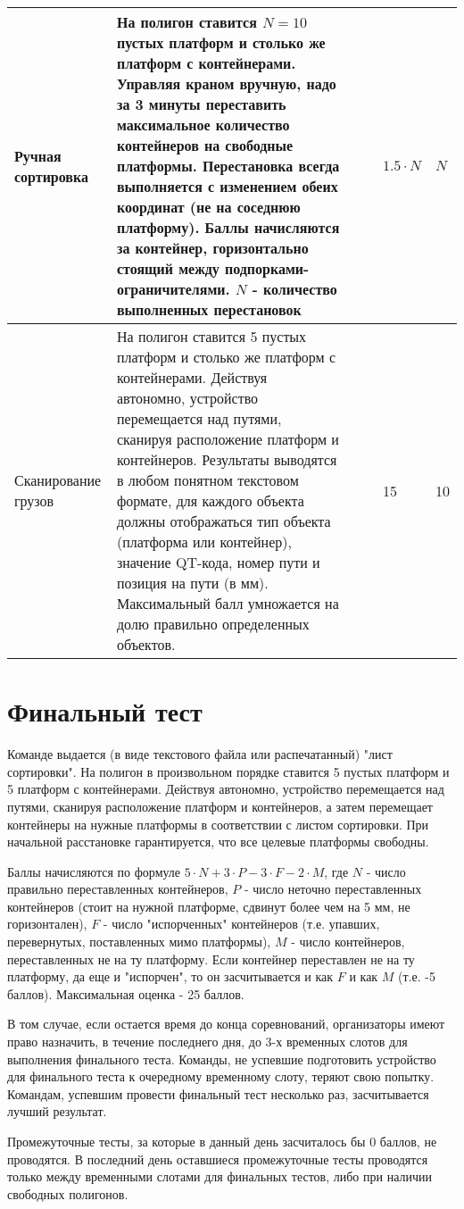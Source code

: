 \begin{center}
\begin{longtable}{|p{2.8cm}|p{6.2cm}|p{1.1cm}|p{1.1cm}|p{1.1cm}|p{1.1cm}|}
        \hline
        Ручная сортировка & На полигон ставится $N=10$ пустых платформ и столько же платформ с контейнерами. Управляя краном вручную, надо за 3 минуты переставить максимальное количество контейнеров на свободные платформы. Перестановка всегда выполняется с изменением обеих координат (не на соседнюю платформу).  Баллы начисляются за контейнер, горизонтально стоящий между подпорками-ограничителями.  $N$ - количество выполненных перестановок & & & $1.5 \cdot N$ & $N$ \\
        \hline
        Сканирование грузов & На полигон ставится 5 пустых платформ и столько же платформ с контейнерами. Действуя автономно, устройство перемещается над путями, сканируя расположение платформ и контейнеров.  Результаты выводятся в любом понятном текстовом формате, для каждого объекта должны отображаться тип объекта (платформа или контейнер), значение QT-кода, номер пути и позиция на пути (в мм). Максимальный балл умножается на долю правильно определенных объектов. & & & 15 & 10 \\
        \hline
    \end{longtable}
\end{center}

\section{Финальный тест} 

Команде выдается (в виде текстового файла или распечатанный) "лист сортировки". На полигон в произвольном порядке ставится 5 пустых платформ и 5 платформ с контейнерами. Действуя автономно, устройство перемещается над путями, сканируя расположение платформ и контейнеров, а затем перемещает контейнеры на нужные платформы в соответствии с листом сортировки. При начальной расстановке гарантируется, что все целевые платформы свободны.  

Баллы начисляются по формуле  $5 \cdot N + 3 \cdot P -3 \cdot F-2 \cdot M$,  где $N$ - число правильно переставленных контейнеров, $P$ - число неточно переставленных контейнеров (стоит на нужной платформе, сдвинут более чем на 5 мм, не горизонтален),  $F$ - число "испорченных" контейнеров (т.е. упавших, перевернутых, поставленных мимо платформы), $M$ - число контейнеров, переставленных не на ту платформу. Если контейнер переставлен не на ту платформу, да еще и "испорчен", то он засчитывается и как $F$ и как $M$  (т.е. -5 баллов).  Максимальная оценка - 25 баллов.

В том случае, если остается время до конца соревнований, организаторы имеют право назначить, в течение последнего дня, до 3-х временных слотов для выполнения финального теста. Команды, не успевшие подготовить устройство для финального теста к очередному временному слоту, теряют свою попытку. Командам, успевшим провести финальный тест несколько раз, засчитывается лучший результат.

Промежуточные тесты, за которые в данный день засчиталось бы 0 баллов, не проводятся.  В последний день оставшиеся промежуточные тесты проводятся только между временными слотами для финальных тестов, либо при наличии свободных полигонов.